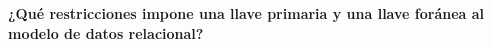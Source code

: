 \textbf{¿Qué restricciones impone una llave primaria y una llave foránea al modelo de datos relacional?}\vspace{.3cm}
